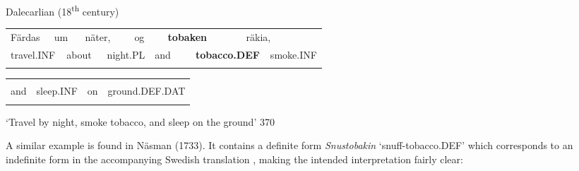 \begin{listWWNumileveli}
\item {}

\begin{styleExample}
Dalecarlian (18\textsuperscript{th} century)

\end{styleExample}

\end{listWWNumileveli}

\begin{tabular}{llllllllllll}
\lsptoprule
Färdas & \multicolumn{2}{l}{um

} & \multicolumn{2}{l}{näter,

} & \multicolumn{2}{l}{og

} & \multicolumn{2}{l}{{\bfseries tobaken}

} & \multicolumn{2}{l}{räkia,

} & \\
\multicolumn{2}{l}{travel.INF

} & \multicolumn{2}{l}{about

} & \multicolumn{2}{l}{night.PL

} & \multicolumn{2}{l}{and

} & \multicolumn{2}{l}{{\bfseries tobacco.DEF}

} & \multicolumn{2}{l}{smoke.INF

}\\
\lspbottomrule
\end{tabular}

\begin{tabular}{llll}
\lsptoprule
\multicolumn{4}{l}{og

}\\
and & sleep.INF & on & ground.DEF.DAT\\
\lspbottomrule
\end{tabular}

\begin{styleTranslation}
‘Travel by night, smoke tobacco, and sleep on the ground’ 370 

\end{styleTranslation}

\begin{styleBodyTextFirst}
A similar example is found in Näsman (1733). It contains a definite form \textit{Snustobakin} ‘snuff-tobacco.DEF’ which corresponds to an indefinite form in the accompanying Swedish translation , making the intended interpretation fairly clear:

\end{styleBodyTextFirst}

